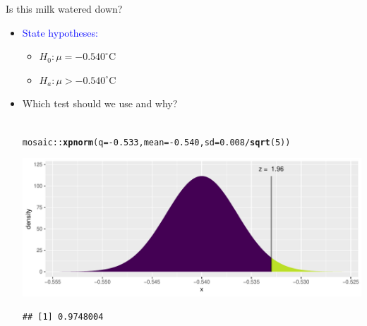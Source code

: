 \documentclass{beamer}\usepackage[]{graphicx}\usepackage[]{color}
\newcommand{\hlnum}[1]{\textcolor[rgb]{0.686,0.059,0.569}{#1}}%
\newcommand{\hlopt}[1]{\textcolor[rgb]{0,0,0}{#1}}%
\newcommand{\hlstd}[1]{\textcolor[rgb]{0.345,0.345,0.345}{#1}}%
\newcommand{\hlkwc}[1]{\textcolor[rgb]{0.333,0.667,0.333}{#1}}%
\newcommand{\hlkwd}[1]{\textcolor[rgb]{0.737,0.353,0.396}{\textbf{#1}}}%
\newenvironment{knitrout}{}{} %
\newcommand{\blue}[1]{\textcolor{blue}{#1}}
\begin{document}
\begin{frame}[fragile]{Is this milk watered down?}
	\begin{itemize}
		\setlength\itemsep{.7em}
		\item \blue{State hypotheses:} \pause \begin{itemize}
			\item $H_0: \mu =  -0.540^{\circ}$C \pause
			\item  $H_a: \mu >  -0.540^{\circ}$C
		\end{itemize}
		\item Which test should we use and why? \pause \\ \ \\

		
\begin{knitrout}\scriptsize
{}\color{fgcolor}
\begin{alltt}
\hlstd{mosaic}\hlopt{::}\hlkwd{xpnorm}\hlstd{(}\hlkwc{q} \hlstd{=} \hlopt{-}\hlnum{0.533}\hlstd{,} \hlkwc{mean} \hlstd{=} \hlopt{-}\hlnum{0.540}\hlstd{,} \hlkwc{sd} \hlstd{=} \hlnum{0.008}\hlopt{/}\hlkwd{sqrt}\hlstd{(}\hlnum{5}\hlstd{))}
\end{alltt}


{\ttfamily\noindent\itshape\color{messagecolor}{\#\# }}

{\ttfamily\noindent\itshape{}}

{\ttfamily\noindent\itshape\color{messagecolor}{\#\# 	P(X <= -0.533) = P(Z <= 1.957) = 0.9748}}

{\ttfamily\noindent\itshape\color{messagecolor}{\#\# 	P(X >\ \ -0.533) = P(Z >\ \ 1.957) = 0.0252}}

{\ttfamily\noindent\itshape\color{messagecolor}{\#\# }}

{\centering \includegraphics[width=1\linewidth]{figure/unnamed-chunk-1-1} 

}


\begin{verbatim}
## [1] 0.9748004
\end{verbatim}

\end{knitrout}

\end{itemize}
\end{frame}
\end{document}

